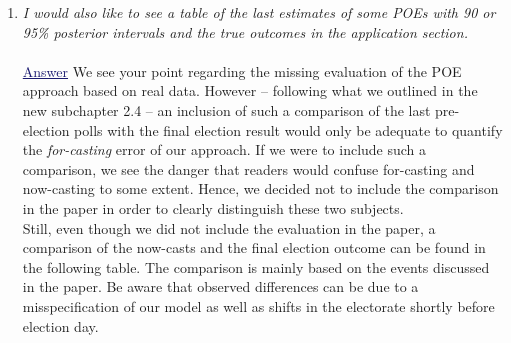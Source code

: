 \documentclass{scrartcl}
\newcommand{\blue}[1]{\textcolor{MidnightBlue}{\underline{\textcolor{MidnightBlue}{#1}}}}
\begin{document}
\begin{enumerate}
  \item \emph{
I would also like to see a table of the last estimates of some POEs with 90 or 95\% posterior intervals and the true outcomes in the application section.
}
  \\ \\
  \blue{Answer} We see your point regarding the missing evaluation of the POE approach based on real data.
However -- following what we outlined in the new subchapter 2.4 -- an inclusion of such a comparison of the last pre-election polls with the final election result would only be adequate to quantify the \emph{for-casting} error of our approach. If we were to include such a comparison, we see the danger that readers would confuse for-casting and now-casting to some extent. Hence, we decided not to include the comparison in the paper in order to clearly distinguish these two subjects.\\
Still, even though we did not include the evaluation in the paper, a comparison of the now-casts and the final election outcome can be found in the following table. The comparison is mainly based on the events discussed in the paper. Be aware that observed differences can be due to a misspecification of our model as well as shifts in the electorate shortly before election day.
\end{enumerate}
\end{document}
